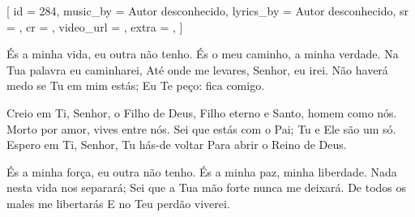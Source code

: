 [
    id          = {284},
    music_by    = {Autor desconhecido},
    lyrics_by   = {Autor desconhecido},
    sr          = {},
    cr          = {},
    video_url   = {},
    extra       = {},
]

\beginverse
És a minha vida, eu outra não tenho. 
És o meu caminho, a minha verdade.
Na Tua palavra eu caminharei,
Até onde me levares, Senhor, eu irei.
Não haverá medo se Tu em mim estás; 
Eu Te peço: fica comigo.
\endverse

\beginverse
Creio em Ti, Senhor, o Filho de Deus, 
Filho eterno e Santo, homem como nós. 
Morto por amor, vives entre nós. 
Sei que estás com o Pai; Tu e Ele são um só. 
Espero em Ti, Senhor, Tu hás-de voltar 
Para abrir o Reino de Deus. 
\endverse

\beginverse
És a minha força, eu outra não tenho. 
És a minha paz, minha liberdade. 
Nada nesta vida nos separará; 
Sei que a Tua mão forte nunca me deixará. 
De todos os males me libertarás 
E no Teu perdão viverei.
\endverse

\endsong
